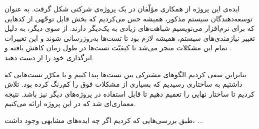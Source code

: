 ایده‌ی این پروژه از همکاری مؤلّفان در یک پروژه‌ی شرکتی شکل گرفت. به عنوان توسعه‌دهندگان سیستم مذکور، همیشه حس می‌کردیم که بخش قابل توجّهی از کدهایی که برای  نرم‌افزار می‌نویسیم شباهت‌های زیادی به یک‌دیگر دارند.
از سوی دیگر، به دلیل تغییر نیازمندی‌های سیستم، همیشه لازم بود تا تست‌ها به‌روزرسانی شوند و این تغییرات . تمام این مشکلات منجر می‌شد تا کیفیّت تست‌ها در طول زمان کاهش یافته و اثرگذاری خود را از دست دهند.

بنابراین سعی کردیم الگوهای مشترکی بین تست‌ها پیدا کنیم و با  مکرّر تست‌هایی که داشتیم به ساختاری رسیدیم که بسیاری از مشکلات فوق را کم‌رنگ کرده بود. تلاش کردیم تا ساختار نهایی را تعمیم دهیم تا قابل استفاده در پروژه‌های دیگر نیز باشد. نتیجه معماری‌ای شد که در این پروژه ارائه می‌کنیم.

طبق بررسی‌هایی که کردیم اگر چه ایده‌های مشابهی وجود داشت، ...
